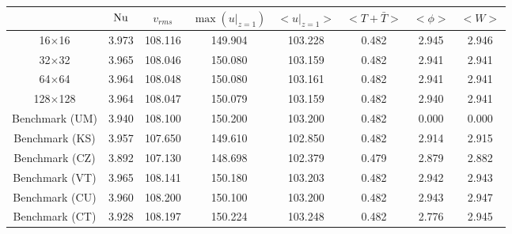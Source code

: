 \begin{tabular}{c|ccccccc}
    & $\mathrm{Nu}$ & $v_{rms}$ & $\max(u|_{z=1})$ & $<u|_{z=1}>$ & $<T + \bar{T}>$ & $<\phi>$ & $<W>$ \\
\hline
16$\times$16 & 3.973 & 108.116 & 149.904 & 103.228 & 0.482 & 2.945 & 2.946 \\
32$\times$32 & 3.965 & 108.046 & 150.080 & 103.159 & 0.482 & 2.941 & 2.941 \\
64$\times$64 & 3.964 & 108.048 & 150.080 & 103.161 & 0.482 & 2.941 & 2.941 \\
128$\times$128 & 3.964 & 108.047 & 150.079 & 103.159 & 0.482 & 2.940 & 2.941 \\
\hline
Benchmark (UM) & 3.940 & 108.100 & 150.200 & 103.200 & 0.482 & 0.000 & 0.000 \\
Benchmark (KS) & 3.957 & 107.650 & 149.610 & 102.850 & 0.482 & 2.914 & 2.915 \\
Benchmark (CZ) & 3.892 & 107.130 & 148.698 & 102.379 & 0.479 & 2.879 & 2.882 \\
Benchmark (VT) & 3.965 & 108.141 & 150.180 & 103.203 & 0.482 & 2.942 & 2.943 \\
Benchmark (CU) & 3.960 & 108.200 & 150.100 & 103.200 & 0.482 & 2.943 & 2.947 \\
Benchmark (CT) & 3.928 & 108.197 & 150.224 & 103.248 & 0.482 & 2.776 & 2.945 \\
\end{tabular}
